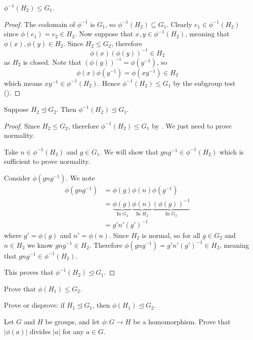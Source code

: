 \begin{proposition}\label{prop-homomorphism-inverse-is-subgroup}
    $\phi^{-1}(H_2) \leq G_1$.
\end{proposition}
\begin{proof}
    The codomain of $\phi^{-1}$ is $G_1$, so $\phi^{-1}(H_2) \subseteq G_1$. Clearly $e_1 \in \phi^{-1}(H_2)$ since $\phi(e_1) = e_2 \in H_2$. Now suppose that $x, y \in \phi^{-1}(H_2)$, meaning that $\phi(x), \phi(y) \in H_2$. Since $H_2 \leq G_2$, therefore
    \[
        \phi(x)\left(\phi(y)\right)^{-1} \in H_2
    \]
    as $H_2$ is closed. Note that $\left(\phi(y)\right)^{-1} = \phi(y^{-1})$, so
    \[
        \phi(x)\phi(y^{-1}) = \phi(xy^{-1}) \in H_2
    \]
    which means $xy^{-1} \in \phi^{-1}(H_2)$. Hence $\phi^{-1}(H_2) \leq G_1$ by the subgroup test ().
\end{proof}

\begin{proposition}
    Suppose $H_2 \unlhd G_2$. Then $\phi^{-1}(H_2) \unlhd G_1$.
\end{proposition}
\begin{proof}
    Since $H_2 \leq G_2$, therefore $\phi^{-1}(H_2) \leq G_1$ by . We just need to prove normality.

    Take $n \in \phi^{-1}(H_2)$ and $g \in G_1$. We will show that $gng^{-1} \in \phi^{-1}(H_2)$ which is sufficient to prove normality.

    Consider $\phi(gng^{-1})$. We note
    \begin{align*}
        \phi(gng^{-1}) &= \phi(g)\phi(n)\phi(g^{-1}) \\
        &= \underbrace{\phi(g)}_{\text{In }G_2} \underbrace{\phi(n)}_{\text{In }H_2} \underbrace{\left(\phi(g)\right)^{-1}}_{\text{In }G_2}\\
        &= g'n'(g')^{-1}
    \end{align*}
    where $g' = \phi(g)$ and $n' = \phi(n)$. Since $H_2$ is normal, so for all $g \in G_2$ and $n \in H_2$ we know $gng^{-1} \in H_2$. Therefore $\phi(gng^{-1}) = g'n'(g')^{-1} \in H_2$, meaning that $gng^{-1} \in \phi^{-1}(H_2)$.

    This proves that $\phi^{-1}(H_2) \unlhd G_1$.
\end{proof}

\begin{exercise}\label{exercise-homomorphism-image-is-subgroup}
    Prove that $\phi(H_1) \leq G_2$.
\end{exercise}
\begin{exercise}
    Prove or disprove: if $H_1 \unlhd G_1$, then $\phi(H_1) \unlhd G_2$.
\end{exercise}
\begin{exercise}\label{exercise-order-of-homomorphism-divides-order}
    Let $G$ and $H$ be groups, and let $\phi: G \to H$ be a homomorphism. Prove that $|\phi(a)|$ divides $|a|$ for any $a \in G$.
\end{exercise}

